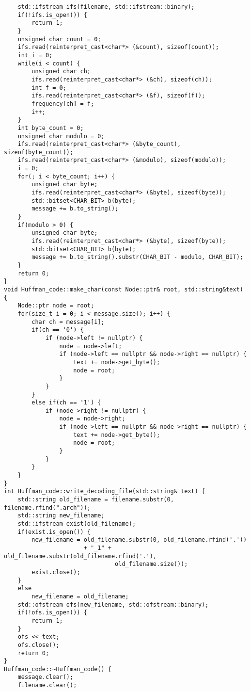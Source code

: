 \begin{verbatim}
    std::ifstream ifs(filename, std::ifstream::binary);
    if(!ifs.is_open()) {
        return 1;
    }
    unsigned char count = 0;
    ifs.read(reinterpret_cast<char*> (&count), sizeof(count));
    int i = 0;
    while(i < count) {
        unsigned char ch;
        ifs.read(reinterpret_cast<char*> (&ch), sizeof(ch));
        int f = 0;
        ifs.read(reinterpret_cast<char*> (&f), sizeof(f));
        frequency[ch] = f;
        i++;
    }
    int byte_count = 0;
    unsigned char modulo = 0;
    ifs.read(reinterpret_cast<char*> (&byte_count), sizeof(byte_count));
    ifs.read(reinterpret_cast<char*> (&modulo), sizeof(modulo));
    i = 0;
    for(; i < byte_count; i++) {
        unsigned char byte;
        ifs.read(reinterpret_cast<char*> (&byte), sizeof(byte));
        std::bitset<CHAR_BIT> b(byte);
        message += b.to_string();
    }
    if(modulo > 0) {
        unsigned char byte;
        ifs.read(reinterpret_cast<char*> (&byte), sizeof(byte));
        std::bitset<CHAR_BIT> b(byte);
        message += b.to_string().substr(CHAR_BIT - modulo, CHAR_BIT);
    }
    return 0;
}
void Huffman_code::make_char(const Node::ptr& root, std::string&text) {
    Node::ptr node = root;
    for(size_t i = 0; i < message.size(); i++) {
        char ch = message[i];
        if(ch == '0') {
            if (node->left != nullptr) {
                node = node->left;
                if (node->left == nullptr && node->right == nullptr) {
                    text += node->get_byte();
                    node = root;
                }
            }
        }
        else if(ch == '1') {
            if (node->right != nullptr) {
                node = node->right;
                if (node->left == nullptr && node->right == nullptr) {
                    text += node->get_byte();
                    node = root;
                }
            }
        }
    }
}
int Huffman_code::write_decoding_file(std::string& text) {
    std::string old_filename = filename.substr(0, filename.rfind(".arch"));
    std::string new_filename;
    std::ifstream exist(old_filename);
    if(exist.is_open()) {
        new_filename = old_filename.substr(0, old_filename.rfind('.'))
                       + "_1" + old_filename.substr(old_filename.rfind('.'),    
                                old_filename.size());
        exist.close();
    }
    else
        new_filename = old_filename;
    std::ofstream ofs(new_filename, std::ofstream::binary);
    if(!ofs.is_open()) {
        return 1;
    }
    ofs << text;
    ofs.close();
    return 0;
}
Huffman_code::~Huffman_code() {
    message.clear();
    filename.clear();

\end{verbatim}
